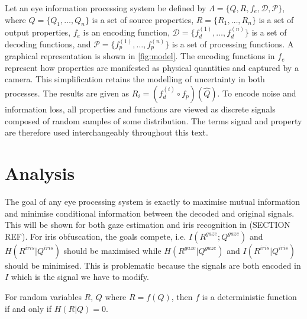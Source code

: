 
Let an eye information processing system be defined by $\Lambda = \{Q, R, f_e, \mathcal{D}, \mathcal{P}\}$, where $Q=\{Q_1, \dots, Q_n\}$ is a set of source properties, $R=\{R_1,\dots,R_n\}$ is a set of output properties, $f_e$ is an encoding function, $\mathcal{D}=\{f_d^{(1)}, \dots, f_d^{(n)}\}$ is a set of decoding functions, and $\mathcal{P}=\{f_p^{(1)}, \dots, f_p^{(n)}\}$ is a set of processing functions. A graphical representation is shown in \autoref{fig:model}. The encoding functions in $f_e$ represent how properties are manifested as physical quantities and captured by a camera. This simplification retains the modelling of uncertainty in both processes. The results are given as $R_i = (f_d^{(i)}\circ f_p)(\hat{Q})$. To encode noise and information loss, all properties and functions are viewed as discrete signals composed of random samples of some distribution. The terms signal and property are therefore used interchangeably throughout this text.


\section{Analysis}
The goal of any eye processing system is exactly to maximise mutual information and minimise conditional information between the decoded and original signals. This will be shown for both gaze estimation and iris recognition in (SECTION REF). For iris obfuscation, the goals compete, i.e. $I(R^{gaze};Q^{gaze})$ and $H(R^{iris}|Q^{iris})$ should be maximised while $H(R^{gaze}|Q^{gaze})$ and $I(R^{iris}|Q^{iris})$ should be minimised. This is problematic because the signals are both encoded in $I$ which is the signal we have to modify. 

\begin{theorem}
    For random variables $R$, $Q$ where $R=f(Q)$, then $f$ is a deterministic function if and only if $H(R|Q)=0$.
\end{theorem}

